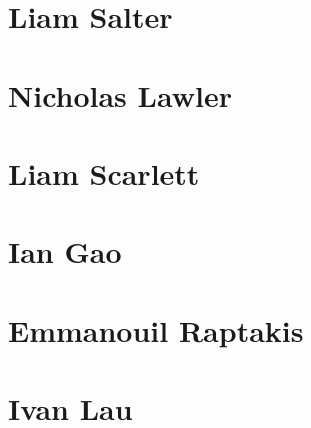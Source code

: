 \documentclass[11pt,a4paper]{report}
\begin{document}
\chapter{Liam Salter}


\chapter{Nicholas Lawler}


\chapter{Liam Scarlett}


\chapter{Ian Gao}


\chapter{Emmanouil Raptakis}


\chapter{Ivan Lau}

\end{document}
